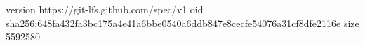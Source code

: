 version https://git-lfs.github.com/spec/v1
oid sha256:648fa432fa3bc175a4e41a6bbe0540a6ddb847e8cecfe54076a31cf8dfe2116e
size 5592580
